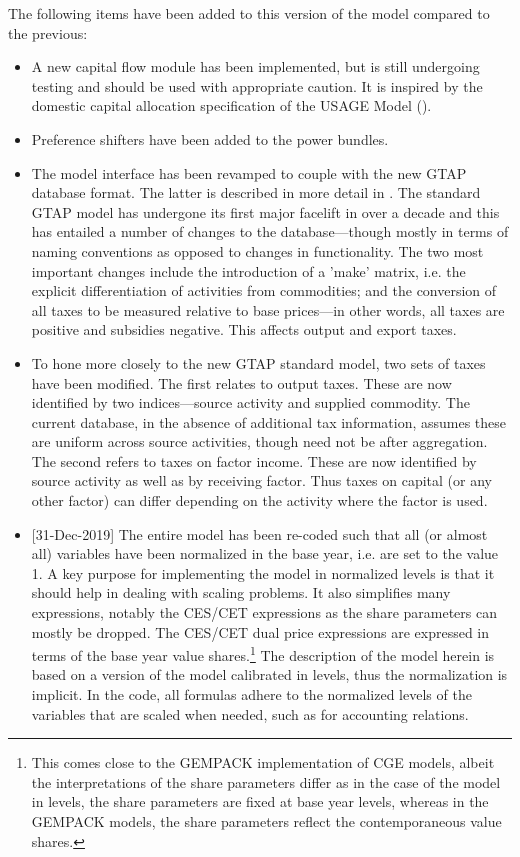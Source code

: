 \documentclass[11pt,letterpaper]{report}
\begin{document}
The following items have been added to this version of the model compared to the
previous:
\begin{itemize}
   \item A new capital flow module has been implemented, but is still undergoing
         testing and should be used with appropriate caution. It is inspired by
         the domestic capital allocation specification of the USAGE Model
         (\cite{DixonRimmer2005}).
   \item Preference shifters have been added to the power bundles.
   \item The model interface has been revamped to couple with the new GTAP
         database format. The latter is described in more detail in
         \cite{CorongetalJGEA2017}. The standard GTAP model has undergone its
         first major facelift in over a decade and this has entailed a number of
         changes to the database---though mostly in terms of naming conventions
         as opposed to changes in functionality. The two most important changes
         include the introduction of a 'make' matrix, i.e. the explicit
         differentiation  of activities from commodities; and the conversion of
         all taxes to be measured relative to base prices---in other words,
         all taxes are positive and subsidies negative. This affects output and
         export taxes.
   \item To hone more closely to the new GTAP standard model, two sets of taxes
         have been modified. The first relates to output taxes. These are now
         identified by two indices---source activity and supplied commodity. The
         current database, in the absence of additional tax information, assumes
         these are uniform across source activities, though need not be after
         aggregation. The second refers to taxes on factor income. These are now
         identified by source activity as well as by receiving factor. Thus
         taxes on capital (or any other factor) can differ depending on the
         activity where the factor is used.
\item {[31-Dec-2019] The entire model has been re-coded such that all (or almost all)
variables have been normalized in the base year, i.e. are set to the value 1.
A key purpose for implementing the model in normalized levels is that it should
help in dealing with scaling problems. It also simplifies many expressions,
notably the CES/CET expressions as the share parameters can mostly be dropped.
The CES/CET dual price expressions are expressed in terms of the base year
value shares.\footnote{This comes close to the GEMPACK implementation of
CGE models, albeit the interpretations of the share parameters differ as in
the case of the model in levels, the share parameters are fixed at base
year levels, whereas in the GEMPACK models, the share parameters reflect
the contemporaneous value shares.} The description of the model herein
is based on a version of the model calibrated in levels, thus the normalization
is implicit. In the code, all formulas adhere to the normalized levels of
the variables that are scaled when needed, such as for accounting relations.}
\end{itemize}
\end{document}
